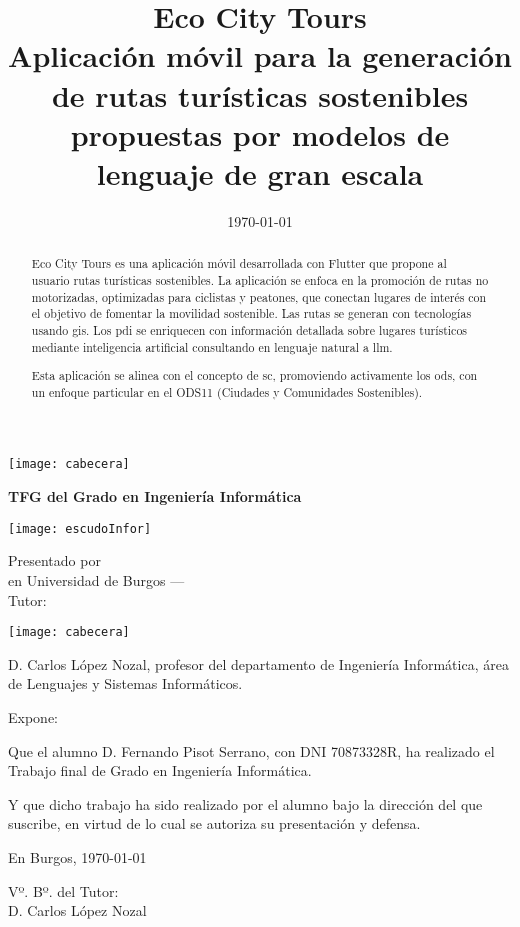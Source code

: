 \documentclass[a4paper,12pt,twoside]{memoir}
\title{\fontsize{18pt}{22pt}\selectfont Eco City Tours\\
	\fontsize{16pt}{18pt}\selectfont Aplicación móvil para la generación de rutas turísticas sostenibles propuestas por modelos de lenguaje de gran escala}
\author{\nombre}
\date{\today}
\makeatletter
\def\maketitle{
  \null
  \thispagestyle{empty}
\noindent\texttt{[image: cabecera]}\vspace{1cm}%
  \vfill
  
  \colorbox{cpardoBox}{%
    \begin{minipage}{.8\textwidth}
      \vspace{.5cm}\Large
      \begin{center}
      \textbf{TFG del Grado en Ingeniería Informática}\vspace{.6cm}\\
      \textbf{\LARGE\@title{}}
      \end{center}
      \vspace{.2cm}
    \end{minipage}

  }%
  \hfill\begin{minipage}{.20\textwidth}
    \texttt{[image: escudoInfor]}
  \end{minipage}
  \vfill
  
  \begin{center}%
  {%
    \noindent\LARGE
    Presentado por \@author{}\\ 
    en Universidad de Burgos --- \@date{}\\
    Tutor: \@tutor{}\\
  }%
  \end{center}%
  \null
  \cleardoublepage
  }
\newcommand{\nombre}{Fernando Pisot Serrano}
\makeatother
\begin{document}
\maketitle




\thispagestyle{empty}


\noindent\texttt{[image: cabecera]}\vspace{1cm}

\noindent D. Carlos López Nozal, profesor del departamento de Ingeniería Informática, área de Lenguajes y Sistemas Informáticos.

\noindent Expone:

\noindent Que el alumno D. \nombre, con DNI 70873328R, ha realizado el Trabajo final de Grado en Ingeniería Informática. 

\noindent Y que dicho trabajo ha sido realizado por el alumno bajo la dirección del que suscribe, en virtud de lo cual se autoriza su presentación y defensa.

\begin{center} %
En Burgos, {\large \today}
\end{center}

\vfill\vfill\vfill

\begin{center}
  Vº. Bº. del Tutor:\\[2cm]
  D. Carlos López Nozal \@tutor{}
  \end{center}


\newpage\null\thispagestyle{empty}\newpage




\frontmatter

\renewcommand*\abstractname{Resumen}
\begin{abstract}
Eco City Tours es una aplicación móvil desarrollada con Flutter que propone al usuario rutas turísticas sostenibles. La aplicación se enfoca en la promoción de rutas no motorizadas, optimizadas para ciclistas y peatones, que conectan lugares de interés con el objetivo de fomentar la movilidad sostenible. Las rutas se generan con tecnologías usando \acrfull{gis}. Los \acrfull{pdi} se enriquecen con información detallada sobre lugares turísticos mediante inteligencia artificial consultando en lenguaje natural a \acrfull{llm}.

Esta aplicación se alinea con el concepto de \acrshort{sc}, promoviendo activamente los \acrfull{ods}, con un enfoque particular en el ODS11 (Ciudades y Comunidades Sostenibles).


\end{abstract}
\end{document}
